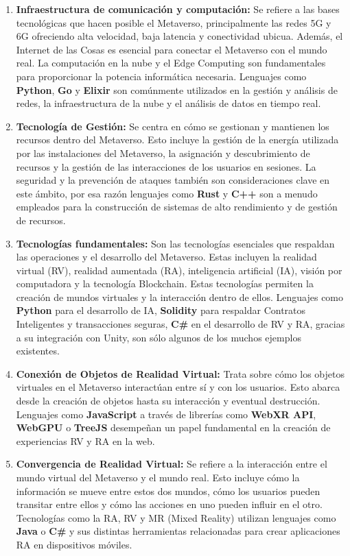 \documentclass[a4paper,10pt]{article}
\begin{document}
	\begin{enumerate}
		\item \textbf{Infraestructura de comunicación y computación:} Se refiere a las bases tecnológicas que hacen posible el Metaverso, principalmente las redes 5G y 6G ofreciendo alta velocidad, baja latencia y conectividad ubicua. Además, el Internet de las Cosas es esencial para conectar el Metaverso con el mundo real. La computación en la nube y el Edge Computing son fundamentales para proporcionar la potencia informática necesaria. Lenguajes como \textbf{Python}, \textbf{Go} y \textbf{Elixir} son comúnmente utilizados en la gestión y análisis de redes, la infraestructura de la nube y el análisis de datos en tiempo real.
		\item \textbf{Tecnología de Gestión:} Se centra en cómo se gestionan y mantienen los recursos dentro del Metaverso. Esto incluye la gestión de la energía utilizada por las instalaciones del Metaverso, la asignación y descubrimiento de recursos y la gestión de las interacciones de los usuarios en sesiones. La seguridad y la prevención de ataques también son consideraciones clave en este ámbito, por esa razón lenguajes como \textbf{Rust} y \textbf{C++} son a menudo empleados para la construcción de sistemas de alto rendimiento y de gestión de recursos.
		\item \textbf{Tecnologías fundamentales:} Son las tecnologías esenciales que respaldan las operaciones y el desarrollo del Metaverso. Estas incluyen la realidad virtual (RV), realidad aumentada (RA), inteligencia artificial (IA), visión por computadora y la tecnología Blockchain. Estas tecnologías permiten la creación de mundos virtuales y la interacción dentro de ellos. Lenguajes como \textbf{Python} para el desarrollo de IA, \textbf{Solidity} para respaldar Contratos Inteligentes y transacciones seguras, \textbf{C\#} en el desarrollo de RV y RA, gracias a su integración con Unity, son sólo algunos de los muchos ejemplos existentes.
		\item \textbf{Conexión de Objetos de Realidad Virtual:} Trata sobre cómo los objetos virtuales en el Metaverso interactúan entre sí y con los usuarios. Esto abarca desde la creación de objetos hasta su interacción y eventual destrucción. Lenguajes como \textbf{JavaScript} a través de librerías como \textbf{WebXR API}, \textbf{WebGPU} o \textbf{TreeJS} desempeñan un papel fundamental en la creación de experiencias RV y RA en la web.
		\item \textbf{Convergencia de Realidad Virtual:} Se refiere a la interacción entre el mundo virtual del Metaverso y el mundo real. Esto incluye cómo la información se mueve entre estos dos mundos, cómo los usuarios pueden transitar entre ellos y cómo las acciones en uno pueden influir en el otro. Tecnologías como la RA, RV y MR (Mixed Reality) utilizan lenguajes como \textbf{Java} o \textbf{C\#} y sus distintas herramientas relacionadas para crear aplicaciones RA en dispositivos móviles.
	\end{enumerate}
\end{document}
